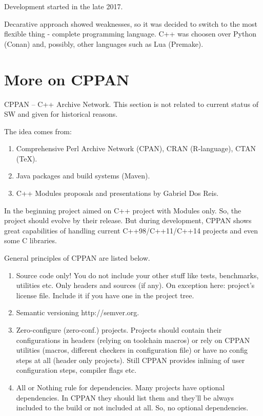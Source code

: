 Development started in the late 2017.

Decarative approach showed weaknesses, so it was decided to switch to the most flexible thing - complete programming language. C++ was choosen over Python (Conan) and, possibly, other languages such as Lua (Premake).


\section*{More on CPPAN}

CPPAN -- C++ Archive Network.
This section is not related to current status of SW and given for historical reasons.

The idea comes from:

\begin{enumerate}
\item
Comprehensive Perl Archive Network (CPAN), CRAN (R-language), CTAN (TeX).
\item
Java packages and build systems (Maven).
\item
C++ Modules proposals and presentations by Gabriel Dos Reis.
\end{enumerate}

In the beginning project aimed on C++ project with Modules only. So, the project should evolve by their release. But during development, CPPAN shows great capabilities of handling current C++98/C++11/C++14 projects and even some C libraries.

General principles of CPPAN are listed below.

\begin{enumerate}
\item
Source code only! You do not include your other stuff like tests, benchmarks, utilities etc. Only headers and sources (if any). On exception here: project's license file. Include it if you have one in the project tree.

\item
Semantic versioning http://semver.org.

\item
Zero-configure (zero-conf.) projects. Projects should contain their configurations in headers (relying on toolchain macros) or rely on CPPAN utilities (macros, different checkers in configuration file) or have no config steps at all (header only projects). Still CPPAN provides inlining of user configuration steps, compiler flags etc.

\item
All or Nothing rule for dependencies. Many projects have optional dependencies. In CPPAN they should list them and they'll be always included to the build or not included at all. So, no optional dependencies.
\end{enumerate}


